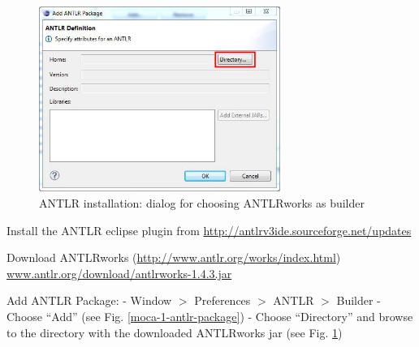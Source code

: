 \begin{figure}[htp]
\begin{center}
 \includegraphics[width=0.7\textwidth]{pics/moca/0Install/2-choose-path-to-jar}
  \caption{ANTLR installation: dialog for choosing ANTLRworks as builder}
  \label{moca-2-choose-path-to-jar}
\end{center}
\end{figure}

Install the ANTLR eclipse plugin from
\url{http://antlrv3ide.sourceforge.net/updates}

Download ANTLRworks (\url{http://www.antlr.org/works/index.html})
\url{www.antlr.org/download/antlrworks-1.4.3.jar}

Add ANTLR Package:
- Window $>$ Preferences $>$ ANTLR $>$ Builder 
- Choose ``Add'' (see Fig. \ref{moca-1-antlr-package})
- Choose ``Directory'' and browse to the directory with the downloaded
ANTLRworks jar (see Fig. \ref{moca-2-choose-path-to-jar})



%

%

%
 
